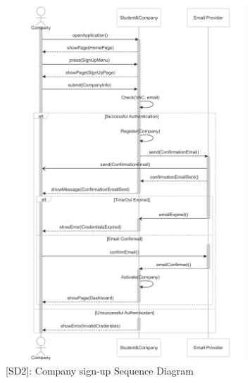 \begin{figure}
    \centering
    \includegraphics[width=0.8\textwidth]{Latex/Images/RASD/SequenceDiagrams/CompanySignUpSequenceDiagram.png}
    \caption{[SD2]: Company sign-up Sequence Diagram}
    \label{fig:SD2}
\end{figure}
\clearpage

